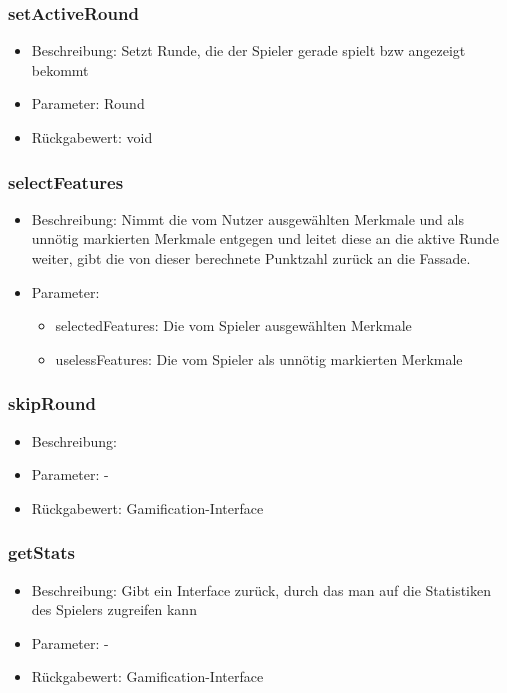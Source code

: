 \documentclass[a4paper]{scrreprt}
\begin{document}
	\subsubsection{setActiveRound}
	\begin{itemize}
		\item Beschreibung: Setzt Runde, die der Spieler gerade spielt bzw angezeigt bekommt
		\item Parameter: Round
		\item Rückgabewert: void
	\end{itemize}
	\subsubsection{selectFeatures}
	\begin{itemize}
		\item Beschreibung: Nimmt die vom Nutzer ausgewählten Merkmale und als unnötig markierten Merkmale entgegen und leitet diese an die aktive Runde weiter, gibt die von dieser berechnete Punktzahl zurück an die Fassade.
		\item Parameter:
		\begin{itemize}
			\item selectedFeatures: Die vom Spieler ausgewählten Merkmale
			\item uselessFeatures: Die vom Spieler als unnötig markierten Merkmale
		\end{itemize}
	\end{itemize}
	\subsubsection{skipRound}
	\begin{itemize}
		\item Beschreibung: %
		\item Parameter: -
		\item Rückgabewert: Gamification-Interface
	\end{itemize}
	\subsubsection{getStats}
	\begin{itemize}
		\item Beschreibung: Gibt ein Interface zurück, durch das man auf die Statistiken des Spielers zugreifen kann
		\item Parameter: -
		\item Rückgabewert: Gamification-Interface
	\end{itemize}
\end{document}
